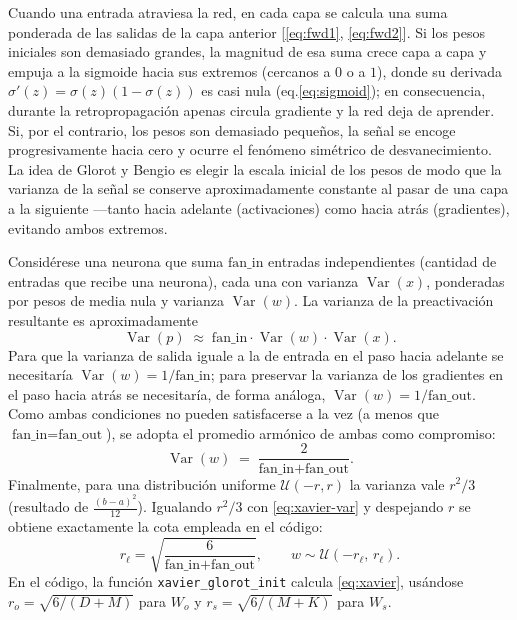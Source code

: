 \documentclass[11pt,a4paper]{article}
\begin{document}
Cuando una entrada atraviesa la red, en cada capa se calcula una suma ponderada
de las salidas de la capa anterior [\ref{eq:fwd1}, \ref{eq:fwd2}]. Si los pesos
iniciales son demasiado grandes, la magnitud de esa suma crece capa a
capa y empuja a la sigmoide hacia sus extremos (cercanos a $0$ o a $1$), donde su
derivada $\sigma'(z)=\sigma(z)(1-\sigma(z))$ es casi nula (eq.\ref{eq:sigmoid}); en
consecuencia, durante la retropropagación apenas circula gradiente y la red deja
de aprender. Si, por el contrario, los pesos son
demasiado pequeños, la señal se encoge progresivamente hacia cero y ocurre
el fenómeno simétrico de desvanecimiento. La idea de
Glorot y Bengio \cite{glorot2010} es elegir la escala inicial de los pesos de
modo que la varianza de la señal se conserve aproximadamente constante
al pasar de una capa a la siguiente —tanto hacia adelante (activaciones) como
hacia atrás (gradientes), evitando ambos extremos.

Considérese una neurona que suma $\text{fan\_in}$ entradas independientes (cantidad de entradas que recibe una neurona), cada
una con varianza $\operatorname{Var}(x)$, ponderadas por pesos de media nula y
varianza $\operatorname{Var}(w)$. La varianza de la preactivación resultante es
aproximadamente
\begin{equation}
  \operatorname{Var}(p)\;\approx\;\text{fan\_in}\cdot
     \operatorname{Var}(w)\cdot \operatorname{Var}(x).
  \label{eq:var-prop}
\end{equation}
Para que la varianza de salida iguale a la de entrada en el paso hacia
adelante se necesitaría $\operatorname{Var}(w)=1/\text{fan\_in}$; para preservar
la varianza de los gradientes en el paso hacia atrás se necesitaría, de forma
análoga, $\operatorname{Var}(w)=1/\text{fan\_out}$. Como ambas condiciones no
pueden satisfacerse a la vez (a menos que $\text{fan\_in}=\text{fan\_out}$), se
adopta el promedio armónico de ambas como compromiso:
\begin{equation}
  \operatorname{Var}(w)\;=\;\frac{2}{\text{fan\_in}+\text{fan\_out}}.
  \label{eq:xavier-var}
\end{equation}
Finalmente, para una distribución uniforme $\mathcal{U}(-r,r)$ la varianza vale
$r^2/3$ (resultado de $\frac{(b-a)^2}{12}$). Igualando $r^2/3$ con \cref{eq:xavier-var} y despejando $r$ se obtiene
exactamente la cota empleada en el código:
\begin{equation}
  r_{\ell}=\sqrt{\frac{6}{\text{fan\_in}+\text{fan\_out}}},\qquad
  w \sim \mathcal{U}(-r_\ell,\,r_\ell).
  \label{eq:xavier}
\end{equation}
En el código, la función \texttt{xavier\_glorot\_init} calcula
\cref{eq:xavier}, usándose $r_o=\sqrt{6/(D+M)}$ para $W_o$ y
$r_s=\sqrt{6/(M+K)}$ para $W_s$. \\
\end{document}

